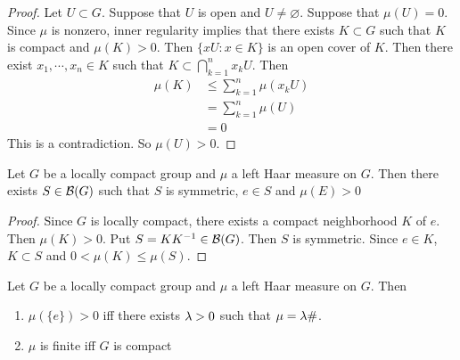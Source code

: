 \documentclass{book}
\begin{document}
	\begin{proof}
		Let $U \subset G$. Suppose that $U$ is open and $U \neq \varnothing$. Suppose that  $\mu(U) = 0$. Since $\mu$ is nonzero, inner regularity implies that there exists $K \subset G$ such that $K$ is compact and $\mu(K) > 0$. Then $ \{xU: x \in K\}$ is an open cover of $K$. Then there exist $x_1, \cdots, x_n \in K$ such that $K \subset \bigcap\limits_{k=1}^n x_kU$. Then 
		\begin{align}
			\mu(K) 
			& \leq \sum\limits_{k =1}^n \mu(x_kU) \\
			& = \sum\limits_{k =1}^n \mu(U) \\
			& = 0
		\end{align} 
		This is a contradiction. So $\mu(U) > 0$.
	\end{proof}

	\begin{ex}  
		Let $G$ be a locally compact group and $\mu$ a left Haar measure on $G$. Then there exists $S \in \mathcal{B}(G)$ such that $S$ is symmetric, $e \in S$ and $\mu(E) > 0$ 
	\end{ex}

	\begin{proof}
		Since $G$ is locally compact, there exists a compact neighborhood $K$ of $e$. Then $\mu(K) > 0$. Put $S = KK^{-1} \in \mathcal{B}(G)$. Then $S$ is symmetric. Since $e \in K$, $K \subset S$ and $0 < \mu(K) \leq \mu(S)$.
	\end{proof}
	
	\begin{ex}  
		Let $G$ be a locally compact group and $\mu$ a left Haar measure on $G$. Then 
		\begin{enumerate}
			\item  $\mu(\{e\}) > 0$ iff there exists $\lambda >0$ such that $\mu = \lambda \#$.
			\item $\mu$ is finite iff $G$ is compact
		\end{enumerate}
	\end{ex}
\end{document}
